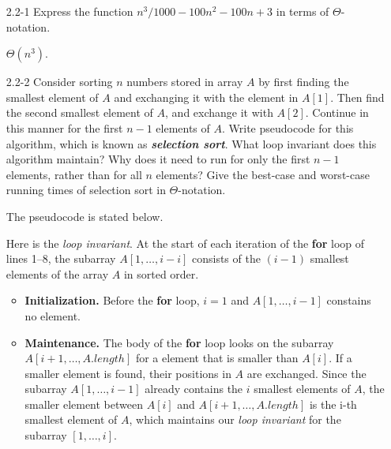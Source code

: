 \begin{enumerate}

\item[2.2{-}1]{Express the function $n^3/1000 - 100n^2 - 100n + 3$ in terms of
$\Theta$-notation.}

\begin{framed}
  $\Theta(n^3)$.
\end{framed}

\item[2.2{-}2]{Consider sorting $n$ numbers stored in array $A$ by first finding
the smallest element of $A$ and exchanging it with the element in $A[1]$. Then
find the second smallest element of $A$, and exchange it with $A[2]$.  Continue
in this manner for the first $n - 1$ elements of $A$. Write pseudocode for this
algorithm, which is known as \textbf{\emph{selection sort}}. What loop invariant
does this algorithm maintain? Why does it need to run for only the first $n - 1$
elements, rather than for all $n$ elements? Give the best-case and worst-case
running times of selection sort in $\Theta$-notation.}

\begin{framed}
The pseudocode is stated below.\\
\begin{algorithm}[H]
\SetAlgoNoEnd\DontPrintSemicolon
\BlankLine
{}
\end{algorithm}

Here is the \emph{loop invariant}. At the start of each iteration of the
\textbf{for} loop of lines 1{--}8, the subarray $A[1, \dots, i - i]$ consists of
the $(i - 1)$ smallest elements of the array $A$ in sorted order.

\begin{itemize}
  \item \textbf{Initialization.} Before the \textbf{for} loop, $i = 1$ and $A[1,
    \dots, i - 1]$ constains no element.

  \item \textbf{Maintenance.} The body of the \textbf{for} loop looks on the
    subarray $A[i + 1, \dots, A.length]$ for a element that is smaller than
    $A[i]$. If a smaller element is found, their positions in $A$ are exchanged.
    Since the subarray $A[1, \dots, i - 1]$ already contains the $i$ smallest
    elements of $A$, the smaller element between $A[i]$ and $A[i + 1, \dots,
    A.length]$ is the i-th smallest element of $A$, which maintains our
    \emph{loop invariant} for the subarray $[1, \dots, i]$.


\end{itemize}
\end{framed}
\end{enumerate}
